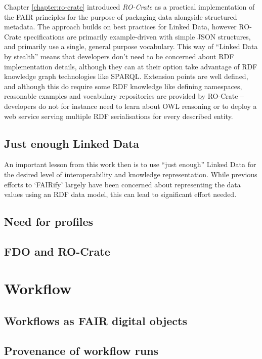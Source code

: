 Chapter \vref{chapter:ro-crate} introduced \emph{RO-Crate} as a practical implementation of the FAIR principles for the purpose of packaging data alongside structured metadata. The approach builds on best practices for Linked Data, however RO-Crate specifications are primarily example-driven with simple JSON structures, and primarily use a single, general purpose vocabulary. This way of ``Linked Data by stealth'' means that developers don't need to be concerned about RDF implementation details, although they can at their option take advantage of RDF knowledge graph technologies like SPARQL. Extension points are well defined, and although this do require some RDF knowledge like defining namespaces, reasonable examples and vocabulary repositories are provided by RO-Crate --  developers do not for instance need to learn about OWL reasoning or to deploy a web service serving multiple RDF serialisations for every described entity.


\subsection{Just enough Linked Data}

An important lesson from this work then is to use ``just enough'' Linked Data for the desired level of interoperability and knowledge representation. While previous efforts to `FAIRify' largely have been concerned about representing the data values using an RDF data model, this can lead to significant effort needed. 


\subsection{Need for profiles}


\subsection{FDO and RO-Crate}



\section{Workflow}

\subsection{Workflows as FAIR digital objects}


\subsection{Provenance of workflow runs}


